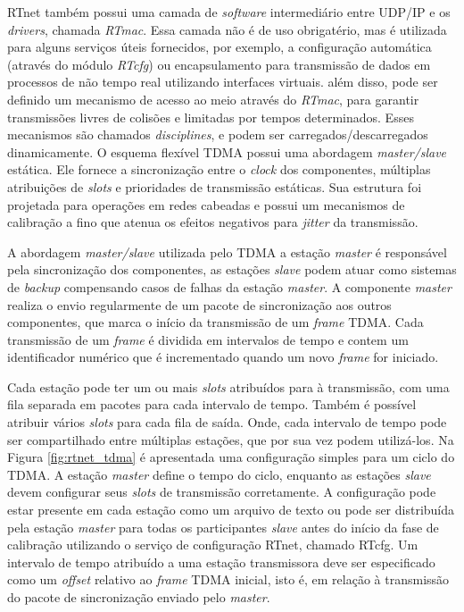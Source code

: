 \documentclass[conference]{IEEEtran}
\begin{document}
RTnet também possui uma camada de \textit{software} intermediário entre UDP/IP e os \textit{drivers}, chamada \textit{RTmac}. Essa camada não é de uso obrigatério, mas é utilizada para alguns serviços úteis fornecidos, por exemplo, a configuração automática (através do módulo \textit{RTcfg}) ou encapsulamento para transmissão de dados em processos de não tempo real utilizando interfaces virtuais. além disso, pode ser definido um mecanismo de acesso ao meio através do \textit{RTmac}, para garantir transmissões livres de colisões e limitadas por tempos determinados. Esses mecanismos são chamados \textit{disciplines}, e podem ser carregados/descarregados dinamicamente. O esquema flexível TDMA possui uma abordagem \textit{master/slave} estática. Ele fornece a sincronização entre o \textit{clock} dos componentes, múltiplas atribuições de \textit{slots} e prioridades de transmissão estáticas. Sua estrutura foi projetada para operações em redes cabeadas e possui um mecanismos de calibração a fino que atenua os efeitos negativos para \textit{jitter} da transmissão.

A abordagem \textit{master/slave} utilizada pelo TDMA \cite{rt_net_IEEE_so53551} a estação \textit{master} é responsável pela sincronização dos componentes, as estações \textit{slave} podem atuar como sistemas de \textit{backup} compensando casos de falhas da estação \textit{master}. A componente \textit{master} realiza o envio regularmente de um pacote de sincronização aos outros componentes, que marca o início da transmissão de um \textit{frame} TDMA. Cada transmissão de um \textit{frame} é dividida em intervalos de tempo e contem um identificador numérico que é incrementado quando um novo \textit{frame} for iniciado. 

Cada estação pode ter um ou mais \textit{slots} atribuídos para à transmissão, com uma fila separada em pacotes para cada intervalo de tempo. Também é possível atribuir vários \textit{slots} para cada fila de saída. Onde, cada intervalo de tempo pode ser compartilhado entre múltiplas estações, que por sua vez podem utilizá-los. Na Figura \ref{fig:rtnet_tdma} é apresentada uma configuração simples para um ciclo do TDMA. A estação \textit{master} define o tempo do ciclo, enquanto as estações \textit{slave} devem configurar seus \textit{slots} de transmissão corretamente. A configuração pode estar presente em cada estação como um arquivo de texto ou pode ser distribuída pela estação \textit{master} para todas os participantes \textit{slave} antes do início da fase de calibração utilizando o serviço de configuração RTnet, chamado RTcfg. Um intervalo de tempo atribuído a uma estação transmissora deve ser especificado como um \textit{offset} relativo ao \textit{frame} TDMA inicial, isto é, em relação à transmissão do pacote de sincronização enviado pelo \textit{master}.
\end{document}
